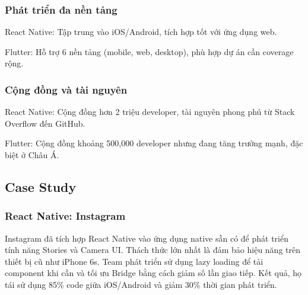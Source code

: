     \subsubsection{Phát triển đa nền tảng}
    \begin{flushleft}
      \hspace*{0.8cm}React Native: Tập trung vào iOS/Android, tích hợp tốt với ứng dụng web.
    \end{flushleft}

    \begin{flushleft}
        \hspace*{0.8cm}Flutter: Hỗ trợ 6 nền tảng (mobile, web, desktop), phù hợp dự án cần coverage rộng.
      \end{flushleft}

    \subsubsection{Cộng đồng và tài nguyên}
    \begin{flushleft}
      \hspace*{0.8cm}React Native: Cộng đồng hơn 2 triệu developer, tài nguyên phong phú từ Stack Overflow đến GitHub.
    \end{flushleft}

    \begin{flushleft}
        \hspace*{0.8cm}Flutter: Cộng đồng khoảng 500,000 developer nhưng đang tăng trưởng mạnh, đặc biệt ở Châu Á.
      \end{flushleft}

\subsection{Case Study}
\renewcommand{\labelitemi}{--}    
\subsubsection{React Native: Instagram}
\begin{flushleft}
  \hspace*{0.8cm}Instagram đã tích hợp React Native vào ứng dụng native sẵn có để phát triển tính năng Stories và Camera UI. Thách thức lớn nhất là đảm bảo hiệu năng trên thiết bị cũ như iPhone 6s. Team phát triển sử dụng lazy loading để tải component khi cần và tối ưu Bridge bằng cách giảm số lần giao tiếp. Kết quả, họ tái sử dụng 85\% code giữa iOS/Android và giảm 30\% thời gian phát triển.
\end{flushleft}

